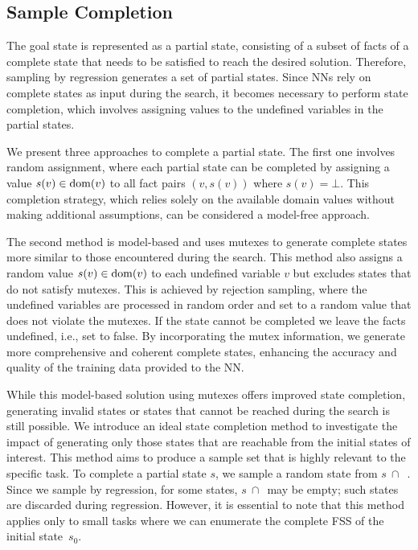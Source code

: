 \subsection{Sample Completion}
\label{sec:sample-completion}

The goal state is represented as a partial state, consisting of a subset of facts of a complete state that needs to be satisfied to reach the desired solution. Therefore, sampling by regression generates a set of partial states. Since NNs rely on complete states as input during the search, it becomes necessary to perform state completion, which involves assigning values to the undefined variables in the partial states.

We present three approaches to complete a partial state. The first one involves random assignment, where each partial state can be completed by assigning a value $s(v)\in\operatorname{dom}(v)$ to all fact pairs $(v,s(v))$ where $s(v)=\bot$. This completion strategy, which relies solely on the available domain values without making additional assumptions, can be considered a model-free approach.

The second method is model-based and uses mutexes to generate complete states more similar to those encountered during the search. This method also assigns a random value $s(v)\in\operatorname{dom}(v)$ to each undefined variable $v$ but excludes states that do not satisfy mutexes. This is achieved by rejection sampling, where the undefined variables are processed in random order and set to a random value that does not violate the mutexes. If the state cannot be completed we leave the facts undefined, i.e., set to false. By incorporating the mutex information, we generate more comprehensive and coherent complete states, enhancing the accuracy and quality of the training data provided to the NN.

While this model-based solution using mutexes offers improved state completion, generating invalid states or states that cannot be reached during the search is still possible. We introduce an ideal state completion method to investigate the impact of generating only those states that are reachable from the initial states of interest. This method aims to produce a sample set that is highly relevant to the specific task. To complete a partial state $s$, we sample a random state from $s~\cap$~\fssp. Since we sample by regression, for some states, $s~\cap$~\fssp may be empty; such states are discarded during regression. However, it is essential to note that this method applies only to small tasks where we can enumerate the complete FSS of the initial state~$s_0$.

